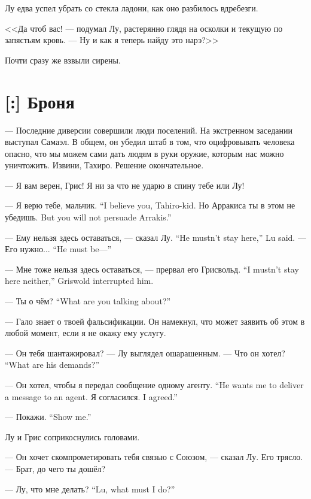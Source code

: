 Лу едва успел убрать со стекла ладони, как оно разбилось вдребезги.

<<Да чтоб вас! --- подумал Лу, растерянно глядя на осколки и текущую по запястьям кровь. --- Ну и как я теперь найду это нарэ?>>

Почти сразу же взвыли сирены.

\section{[:] Броня}

\textspace

--- Последние диверсии совершили люди поселений.
На экстренном заседании выступал Самаэл.
В общем, он убедил штаб в том, что оцифровывать человека опасно, что мы можем сами дать людям в руки оружие, которым нас можно уничтожить.
Извини, Тахиро.
Решение окончательное.

--- Я вам верен, Грис!
Я ни за что не ударю в спину тебе или Лу!

{--- Я верю тебе, мальчик.}
{``I believe you, Tahiro-kid.}
{Но Арракиса ты в этом не убедишь.}
{But you will not persuade Arrakis.''}

{--- Ему нельзя здесь оставаться, --- сказал Лу.}
{``He mustn't stay here,'' Lu said.}
{--- Его нужно...}
{``He must be---''}

{--- Мне тоже нельзя здесь оставаться, --- прервал его Грисвольд.}
{``I mustn't stay here neither,'' Griswold interrupted him.}

{--- Ты о чём?}
{``What are you talking about?''}

--- Гало знает о твоей фальсификации.
Он намекнул, что может заявить об этом в любой момент, если я не окажу ему услугу.

--- Он тебя шантажировал? --- Лу выглядел ошарашенным.
{--- Что он хотел?}
{``What are his demands?''}

{--- Он хотел, чтобы я передал сообщение одному агенту.}
{``He wants me to deliver a message to an agent.}
{Я согласился.}
{I agreed.''}

{--- Покажи.}
{``Show me.''}

Лу и Грис соприкоснулись головами.

--- Он хочет скомпрометировать тебя связью с Союзом, --- сказал Лу.
Его трясло.
--- Брат, до чего ты дошёл?

{--- Лу, что мне делать?}
{``Lu, what must I do?''}

